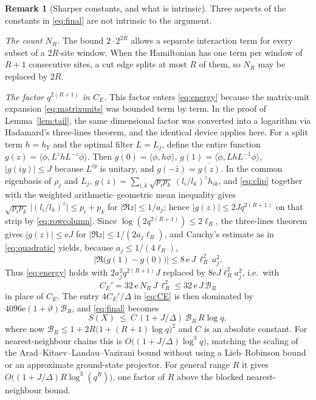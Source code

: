 \documentclass[aps,prx,reprint,superscriptaddress,floatfix,nofootinbib,longbibliography,amsmath,amssymb]{revtex4-2}
\newcommand{\abs}[1]{\lvert #1\rvert}
\newcommand{\cB}{\mathcal B}
\newcommand{\e}{\mathrm e}
\theoremstyle{plain}
\theoremstyle{definition}
\newtheorem{remark}[theorem]{Remark}
\begin{document}
\begin{remark}[Sharper constants, and what is intrinsic]\label{rem:sharper}
Three aspects of the constants in \eqref{eq:final} are not intrinsic to
the argument.

\emph{The count $N_R$.} The bound $2\cdot2^{2R}$ allows a separate
interaction term for every subset of a $2R$-site window. When the
Hamiltonian has one term per window of $R+1$ consecutive sites, a cut edge
splits at most $R$ of them, so $N_R$ may be replaced by $2R$.

\emph{The factor $q^{2(R+1)}$ in $C_E$.} This factor enters
\eqref{eq:energy} because the matrix-unit expansion \eqref{eq:matrixunits}
was bounded term by term. In the proof of Lemma~\ref{lem:tail}, the same
dimensional factor was converted into a logarithm via Hadamard's
three-lines theorem, and the identical device applies here. For a split
term $h=h_Y$ and the optimal filter $L=L_j$, define the entire function
$g(z)=\langle\phi,L^zhL^{-z}\phi\rangle$. Then
$g(0)=\langle\phi,h\phi\rangle$, $g(1)=\langle\phi,LhL^{-1}\phi\rangle$,
$\abs{g(iy)}\le J$ because $L^{iy}$ is unitary, and
$g(-\bar z)=\overline{g(z)}$. In the common eigenbasis of $\rho_j$ and $L_j$,
$g(z)=\sum_{i,k}\sqrt{p_ip_k}\,(l_i/l_k)^zh_{ik}$, and \eqref{eq:clip}
together with the weighted arithmetic--geometric mean inequality gives
$\sqrt{p_ip_k}\,\abs{(l_i/l_k)^z}\le p_i+p_k$ for $\abs{\Re z}\le1/a_j$;
hence $\abs{g(z)}\le 2Jq^{2(R+1)}$ on that strip by \eqref{eq:rowcolumn}.
Since $\log(2q^{2(R+1)})\le2\ell_R$, the three-lines theorem gives
$\abs{g(z)}\le\e J$ for $\abs{\Re z}\le 1/(2a_j\ell_R)$, and Cauchy's
estimate as in \eqref{eq:quadratic} yields, because $a_j\le1/(4\ell_R)$,
\[
 \abs{\Re\bigl(g(1)-g(0)\bigr)}\le 8\,\e\,J\,\ell_R^2\,a_j^2 .
\]
Thus \eqref{eq:energy} holds with $2a_j^2q^{2(R+1)}J$ replaced by
$8\e J\ell_R^2a_j^2$, i.e.\ with
\[
 C_E'=32\,\e\,N_R\,J\,\ell_R^2\le 32\,\e\,J\,\cB_R
\]
in place of $C_E$. The entry $4C_E'/\Delta$ in \eqref{eq:CE} is then
dominated by $4096\e(1+\vartheta)\cB_R$, and \eqref{eq:final} becomes
\[
 S(X)\ \le\ C\,(1+J/\Delta)\,\cB_R\,R\log q,
\]
where now $\cB_R\le 1+2R\bigl(1+(R+1)\log q\bigr)^2$ and $C$ is an absolute
constant.
For nearest-neighbour chains this is
$O\bigl((1+J/\Delta)\log^3q\bigr)$, matching the scaling of the
Arad--Kitaev--Landau--Vazirani bound \cite{AKLV} without using a
Lieb--Robinson bound or an approximate ground-state projector. For general
range $R$ it gives $O\bigl((1+J/\Delta)R\log^3(q^R)\bigr)$, one factor of
$R$ above the blocked nearest-neighbour bound.


\end{remark}
\end{document}
